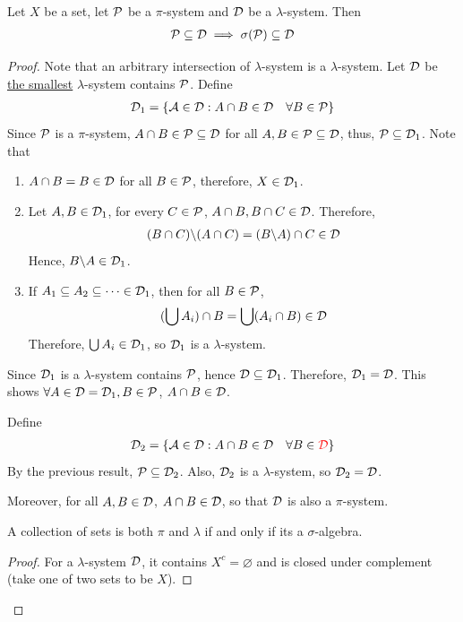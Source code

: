 \documentclass[11pt]{article}
\begin{document}
	\begin{theorem}
		Let $X$ be a set, let $\mathcal{{P}}$ be a $\pi$-system and $\mathcal{{D}}$ be a $\lambda$-system. Then
		\begin{align}
			\mathcal{{P}} \subseteq \mathcal{{D}} \implies \sigma(\mathcal{{P}}) \subseteq \mathcal{{D}}
		\end{align}
		\begin{proof}
			Note that an arbitrary intersection of $\lambda$-system is a $\lambda$-system.
			Let $\mathcal{{D}}$ be \ul{the smallest} $\lambda$-system contains $\mathcal{{P}}$.
			Define
			\begin{align}
				\mathcal{{D}}_1 = \{\mathcal{{A}} \in \mathcal{{D}} : A \cap B \in \mathcal{{D}}\quad \forall B \in \mathcal{{P}}\}
			\end{align}
			Since $\mathcal{{P}}$ is a $\pi$-system, $A \cap B \in \mathcal{{P}} \subseteq \mathcal{{D}}$ for all $A, B \in \mathcal{{P}} \subseteq \mathcal{{D}}$, thus, $\mathcal{{P}} \subseteq \mathcal{{D}}_1$.
			Note that
			\begin{enumerate}
				\item $A \cap B = B \in \mathcal{{D}}$ for all $B \in \mathcal{{P}}$, therefore, $X \in \mathcal{{D}}_1$.
				\item Let $A, B \in \mathcal{{D}}_1$, for every $C \in \mathcal{{P}}$, $A \cap B, B \cap C \in \mathcal{{D}}$. Therefore,
				\begin{align}
					(B \cap C) \backslash (A \cap C) = (B \backslash A) \cap C \in \mathcal{{D}}
				\end{align}
				Hence, $B \backslash A \in \mathcal{{D}}_1$.
				\item If $A_1 \subseteq A_2 \subseteq \dots \in \mathcal{{D}}_1$, then for all $B \in \mathcal{{P}}$,
				\begin{align}
					(\bigcup A_i) \cap B = \bigcup (A_i \cap B) \in \mathcal{{D}}
				\end{align}
				Therefore, $\bigcup A_i \in \mathcal{{D}}_1$, so $\mathcal{{D}}_1$ is a $\lambda$-system.
			\end{enumerate}
			Since $\mathcal{{D}}_1$ is a $\lambda$-system contains $\mathcal{{P}}$, hence $\mathcal{{D}} \subseteq \mathcal{{D}}_1$. Therefore, $\mathcal{{D}}_1 = \mathcal{{D}}$. This shows $\forall A \in \mathcal{{D}} = \mathcal{{D}}_1, B \in \mathcal{{P}}$, $A \cap B \in \mathcal{{D}}$.
			
			Define
			\begin{align}
				\mathcal{{D}}_2 = \{\mathcal{{A}} \in \mathcal{{D}} : A \cap B \in \mathcal{{D}}\quad \forall B \in \textcolor{red}{\mathcal{{D}}}\}
			\end{align}
			By the previous result, $\mathcal{{P}} \subseteq \mathcal{{D}}_2$. Also, $\mathcal{{D}}_2$ is a $\lambda$-system, so $\mathcal{{D}}_2 = \mathcal{{D}}$.
			
			Moreover, for all $A, B \in \mathcal{{D}}$, $A \cap B \in \mathcal{{D}}$, so that $\mathcal{{D}}$ is also a $\pi$-system.
			\begin{tcolorbox}
				\begin{lemma}
					A collection of sets is both $\pi$ and $\lambda$ if and only if its a $\sigma$-algebra.
				\end{lemma}
				\begin{proof}
					For a $\lambda$-system $\mathcal{{D}}$, it contains $X^c = \varnothing$ and is closed under complement (take one of two sets to be $X$).
					

\end{proof}
\end{tcolorbox}
\end{proof}
\end{theorem}
\end{document}
